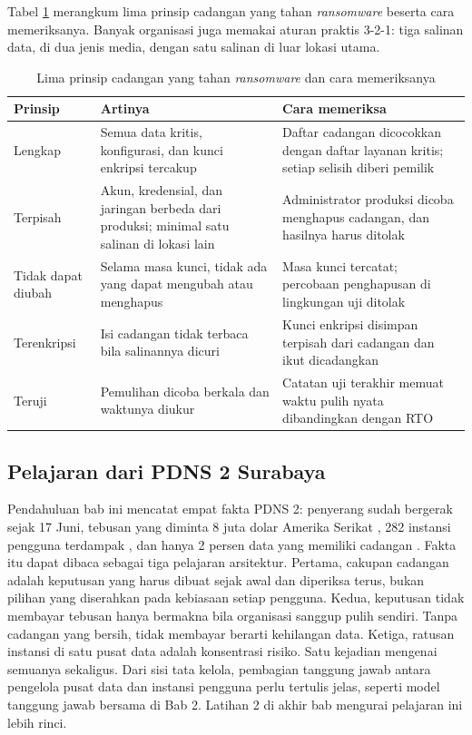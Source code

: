 Tabel \ref{tab:ch12-prinsip-cadangan} merangkum lima prinsip cadangan yang tahan
\textit{ransomware} beserta cara memeriksanya. Banyak organisasi juga memakai aturan praktis 3-2-1:
tiga salinan data, di dua jenis media, dengan satu salinan di luar lokasi utama.

\begin{table}[!htb]
  \centering
  \caption{Lima prinsip cadangan yang tahan \textit{ransomware} dan cara memeriksanya}
  \label{tab:ch12-prinsip-cadangan}
  \footnotesize
  \begin{tabularx}{\textwidth}{>{\raggedright\arraybackslash}p{2.2cm} >{\raggedright\arraybackslash}X >{\raggedright\arraybackslash}X}
    \hline
    \textbf{Prinsip} & \textbf{Artinya} & \textbf{Cara memeriksa} \\ \hline
    Lengkap & Semua data kritis, konfigurasi, dan kunci enkripsi tercakup & Daftar cadangan
      dicocokkan dengan daftar layanan kritis; setiap selisih diberi pemilik \\ \hline
    Terpisah & Akun, kredensial, dan jaringan berbeda dari produksi; minimal satu salinan di
      lokasi lain & Administrator produksi dicoba menghapus cadangan, dan hasilnya harus ditolak
      \\ \hline
    Tidak dapat diubah & Selama masa kunci, tidak ada yang dapat mengubah atau menghapus &
      Masa kunci tercatat; percobaan penghapusan di lingkungan uji ditolak \\ \hline
    Terenkripsi & Isi cadangan tidak terbaca bila salinannya dicuri & Kunci enkripsi disimpan
      terpisah dari cadangan dan ikut dicadangkan \\ \hline
    Teruji & Pemulihan dicoba berkala dan waktunya diukur & Catatan uji terakhir memuat waktu
      pulih nyata dibandingkan dengan RTO \\ \hline
  \end{tabularx}
\end{table}

\subsection{Pelajaran dari PDNS 2 Surabaya}

Pendahuluan bab ini mencatat empat fakta PDNS 2: penyerang sudah bergerak sejak 17 Juni, tebusan
yang diminta 8 juta dolar Amerika Serikat \cite{c12-antara2024}, 282 instansi pengguna terdampak
\cite{c12-cnn2024}, dan hanya 2 persen data yang memiliki cadangan \cite{c12-cnbc2024}. Fakta itu
dapat dibaca sebagai tiga pelajaran arsitektur. Pertama, cakupan cadangan adalah keputusan yang
harus dibuat sejak awal dan diperiksa terus, bukan pilihan yang diserahkan pada kebiasaan setiap
pengguna. Kedua, keputusan tidak membayar tebusan hanya bermakna bila organisasi sanggup pulih
sendiri. Tanpa cadangan yang bersih, tidak membayar berarti kehilangan data. Ketiga, ratusan
instansi di satu pusat data adalah konsentrasi risiko. Satu kejadian mengenai semuanya sekaligus.
Dari sisi tata kelola, pembagian tanggung jawab antara pengelola pusat data dan instansi pengguna
perlu tertulis jelas, seperti model tanggung jawab bersama di Bab 2. Latihan 2 di akhir bab
mengurai pelajaran ini lebih rinci.

